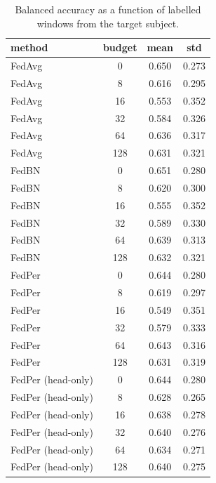 \begin{table}
\caption{Balanced accuracy as a function of labelled windows from the target subject.}
\label{tab:calib}
\begin{tabular}{lccc}
\toprule
method & budget & mean & std \\
\midrule
FedAvg & 0 & 0.650 & 0.273 \\
FedAvg & 8 & 0.616 & 0.295 \\
FedAvg & 16 & 0.553 & 0.352 \\
FedAvg & 32 & 0.584 & 0.326 \\
FedAvg & 64 & 0.636 & 0.317 \\
FedAvg & 128 & 0.631 & 0.321 \\
FedBN & 0 & 0.651 & 0.280 \\
FedBN & 8 & 0.620 & 0.300 \\
FedBN & 16 & 0.555 & 0.352 \\
FedBN & 32 & 0.589 & 0.330 \\
FedBN & 64 & 0.639 & 0.313 \\
FedBN & 128 & 0.632 & 0.321 \\
FedPer & 0 & 0.644 & 0.280 \\
FedPer & 8 & 0.619 & 0.297 \\
FedPer & 16 & 0.549 & 0.351 \\
FedPer & 32 & 0.579 & 0.333 \\
FedPer & 64 & 0.643 & 0.316 \\
FedPer & 128 & 0.631 & 0.319 \\
FedPer (head-only) & 0 & 0.644 & 0.280 \\
FedPer (head-only) & 8 & 0.628 & 0.265 \\
FedPer (head-only) & 16 & 0.638 & 0.278 \\
FedPer (head-only) & 32 & 0.640 & 0.276 \\
FedPer (head-only) & 64 & 0.634 & 0.271 \\
FedPer (head-only) & 128 & 0.640 & 0.275 \\
\bottomrule
\end{tabular}
\end{table}
